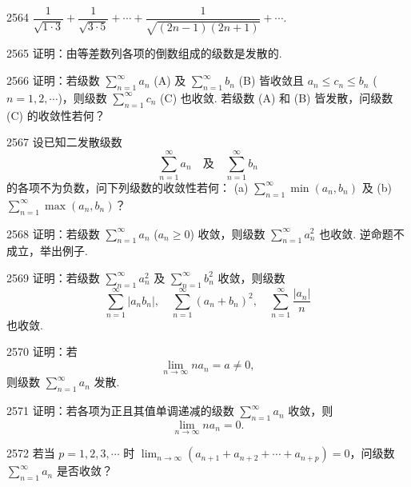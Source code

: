\begin{prob}[S]{2564}
$\dfrac{1}{\sqrt{1 \cdot 3}} + \dfrac{1}{\sqrt{3 \cdot 5}} + \cdots + \dfrac{1}{\sqrt{(2n - 1)(2n + 1)}} + \cdots$.
\end{prob}

\begin{prob}[M]{2565}
证明：由等差数列各项的倒数组成的级数是发散的.
\end{prob}

\begin{prob}[M]{2566}
证明：若级数 $\sum_{n=1}^{\infty} a_n$ (A) 及 $\sum_{n=1}^{\infty} b_n$ (B) 皆收敛且 $a_n \leqslant c_n \leqslant b_n$ ($n = 1, 2, \cdots$)，则级数 $\sum_{n=1}^{\infty} c_n$ (C) 也收敛. 若级数 (A) 和 (B) 皆发散，问级数 (C) 的收敛性若何？
\end{prob}

\begin{prob}[M]{2567}
设已知二发散级数
\[
\sum_{n=1}^{\infty} a_n \quad \text{及} \quad \sum_{n=1}^{\infty} b_n
\]
的各项不为负数，问下列级数的收敛性若何：
(a) $\sum_{n=1}^{\infty} \min(a_n, b_n)$ 及 (b) $\sum_{n=1}^{\infty} \max(a_n, b_n)$？
\end{prob}

\begin{prob}[M]{2568}
证明：若级数 $\sum_{n=1}^{\infty} a_n$ ($a_n \geqslant 0$) 收敛，则级数 $\sum_{n=1}^{\infty} a_n^2$ 也收敛. 逆命题不成立，举出例子.
\end{prob}

\begin{prob}[M]{2569}
证明：若级数 $\sum_{n=1}^{\infty} a_n^2$ 及 $\sum_{n=1}^{\infty} b_n^2$ 收敛，则级数
\[
\sum_{n=1}^{\infty} |a_n b_n|, \quad \sum_{n=1}^{\infty} (a_n + b_n)^2, \quad \sum_{n=1}^{\infty} \frac{|a_n|}{n}
\]
也收敛.
\end{prob}

\begin{prob}[M]{2570}
证明：若
\[
\lim_{n \to \infty} n a_n = a \neq 0,
\]
则级数 $\sum_{n=1}^{\infty} a_n$ 发散.
\end{prob}

\begin{prob}[M]{2571}
证明：若各项为正且其值单调递减的级数 $\sum_{n=1}^{\infty} a_n$ 收敛，则
\[
\lim_{n \to \infty} n a_n = 0.
\]
\end{prob}

\begin{prob}[M]{2572}
若当 $p = 1, 2, 3, \cdots$ 时 $\lim_{n \to \infty} (a_{n+1} + a_{n+2} + \cdots + a_{n+p}) = 0$，问级数 $\sum_{n=1}^{\infty} a_n$ 是否收敛？
\end{prob}

